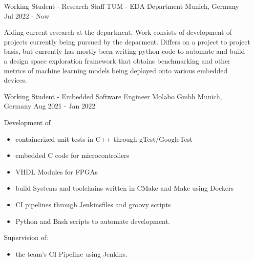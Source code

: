 
\begin{cventries}
  \cventry
    {Working Student - Research Staff} %
    {TUM - EDA Department} %
    {Munich, Germany} %
    {Jul 2022 - Now} %
    {
      \begin{cvitems} %
          Aiding current research at the department. Work consists of development of projects currently being
          pursued by the deparment. Differs on a project to project basis, but currently has mostly been
          writing python code to automate and build a design space exploration framework that obtains
          benchmarking and other metrics of machine learning models being deployed onto various embedded devices.
      \end{cvitems}
    }
  \cventry
    {Working Student - Embedded Software Engineer} %
    {Molabo Gmbh} %
    {Munich, Germany} %
    {Aug 2021 - Jan 2022} %
    {
      \begin{cvitems} %
        \item {Development of}
            \begin{itemize}
                \item {containerized unit tests in C++ through gTest/GoogleTest}
                \item {embedded C code for microcontrollers}
                \item {VHDL Modules for FPGAs}
                \item {build Systems and toolchains written in CMake and Make using Dockers}
                \item {CI pipelines through Jenkinsfiles and groovy scripts}
                \item {Python and Bash scripts to automate development.}
            \end{itemize}
        \item {Supervision of:}
          \begin{itemize}
            \item {the team's CI Pipeline using Jenkins.}
          \end{itemize}
      \end{cvitems}
    }



\end{cventries}
